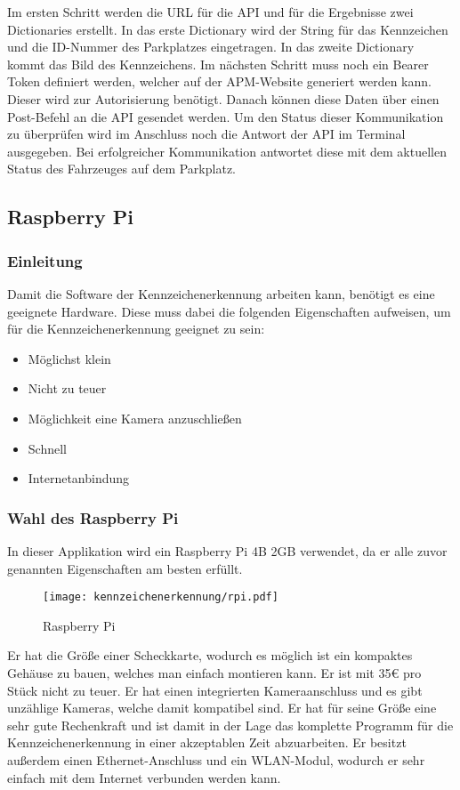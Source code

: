 Im ersten Schritt werden die URL für die API und für die Ergebnisse zwei Dictionaries erstellt. In das erste Dictionary wird der String für das Kennzeichen 
und die ID-Nummer des Parkplatzes eingetragen. In das zweite Dictionary kommt das Bild des Kennzeichens. Im nächsten Schritt muss noch ein Bearer Token 
definiert werden, welcher auf der APM-Website generiert werden kann. Dieser wird zur Autorisierung benötigt. Danach können diese Daten über einen Post-Befehl 
an die API gesendet werden. Um den Status dieser Kommunikation zu überprüfen wird im Anschluss noch die Antwort der API im Terminal ausgegeben. Bei 
erfolgreicher Kommunikation antwortet diese mit dem aktuellen Status des Fahrzeuges auf dem Parkplatz.

\subsection{Raspberry Pi}

\subsubsection{Einleitung}
Damit die Software der Kennzeichenerkennung arbeiten kann, benötigt es eine geeignete Hardware. Diese muss dabei die folgenden Eigenschaften 
aufweisen, um für die Kennzeichenerkennung geeignet zu sein:

\begin{itemize}
    \item Möglichst klein
    \item Nicht zu teuer 
    \item Möglichkeit eine Kamera anzuschließen 
    \item Schnell 
    \item Internetanbindung
\end{itemize}

\subsubsection{Wahl des Raspberry Pi}
In dieser Applikation wird ein Raspberry Pi 4B 2GB verwendet, da er alle zuvor genannten Eigenschaften am besten erfüllt.\\

\begin{figure}[H]
    \centering
    \texttt{[image: kennzeichenerkennung/rpi.pdf]}
    \caption{Raspberry Pi}
\end{figure}

Er hat die Größe einer Scheckkarte, wodurch es möglich ist ein kompaktes Gehäuse zu bauen, welches man einfach montieren kann. 
Er ist mit 35€ pro Stück nicht zu teuer. Er hat einen integrierten Kameraanschluss und es gibt unzählige Kameras, welche damit 
kompatibel sind. Er hat für seine Größe eine sehr gute Rechenkraft und ist damit in der Lage das komplette Programm für die 
Kennzeichenerkennung in einer akzeptablen Zeit abzuarbeiten. Er besitzt außerdem einen Ethernet-Anschluss und ein WLAN-Modul, 
wodurch er sehr einfach mit dem Internet verbunden werden kann.

